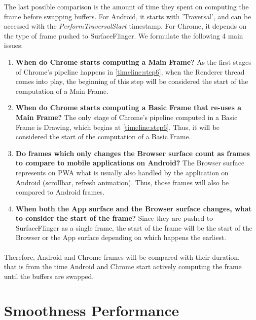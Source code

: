 \documentclass{kththesis}
\begin{document}
The last possible comparison is the amount of time they spent on computing the frame before swapping buffers. For Android, it starts with 'Traversal', and can be accessed with the \textit{PerformTraversalStart} timestamp. For Chrome, it depends on the type of frame pushed to SurfaceFlinger. We formulate the following 4 main issues:
\begin{enumerate}
    \item \textbf{When do Chrome starts computing a Main Frame?} \newline
    As the first stages of Chrome's pipeline happens in \ref{timeline:step6}, when the Renderer thread comes into play, the beginning of this step will be considered the start of the computation of a Main Frame.
    \item \textbf{When do Chrome starts computing a Basic Frame that re-uses a Main Frame?} \newline
    The only stage of Chrome's pipeline computed in a Basic Frame is Drawing, which begins at \ref{timeline:step6}. Thus, it will be considered the start of the computation of a Basic Frame.
    \item \textbf{Do frames which only changes the Browser surface count as frames to compare to mobile applications on Android?} \newline
    The Browser surface represents on PWA what is usually also handled by the application on Android (scrollbar, refresh animation). Thus, those frames will also be compared to Android frames. 
    \item \textbf{When both the App surface and the Browser surface changes, what to consider the start of the frame?} \newline
    Since they are pushed to SurfaceFlinger as a single frame, the start of the frame will be the start of the Browser or the App surface depending on which happens the earliest. 
\end{enumerate}

\paragraph{}
Therefore, Android and Chrome frames will be compared with their duration, that is from the time Android and Chrome start actively computing the frame until the buffers are swapped. 

\section{Smoothness Performance}
\end{document}
